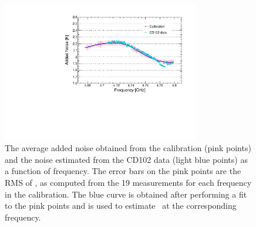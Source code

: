\begin{figure} [htbp]
  \centering
  \includegraphics[width=8.6cm]{figures/Avg_Noise_vs_Freq_run1to19_211118.pdf}
  \caption{The average added noise obtained from the calibration (pink points)
 and the noise estimated from the CD102 data (light blue points) as a 
function of frequency. The error bars on the pink points are the RMS 
of \ta, as computed from the 19 measurements for each frequency 
in the calibration. 
The blue curve is obtained after performing a fit to 
the pink points and is used to estimate \ta\ at the corresponding 
frequency.}
  \label{fig:hemtcalvsf}
\end{figure}


  

